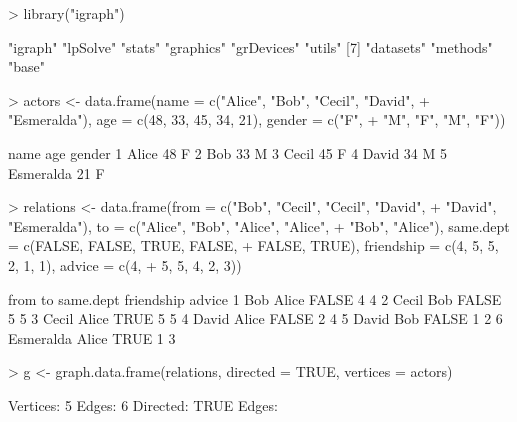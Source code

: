 \documentclass[a4paper,11pt]{scrartcl}
\begin{document}
\begin{Schunk}
\begin{Sinput}
> library("igraph")
\end{Sinput}
\begin{Soutput}
[1] "igraph"    "lpSolve"   "stats"     "graphics"  "grDevices" "utils"    
[7] "datasets"  "methods"   "base"     
\end{Soutput}
\begin{Sinput}
> actors <- data.frame(name = c("Alice", "Bob", "Cecil", "David", 
+     "Esmeralda"), age = c(48, 33, 45, 34, 21), gender = c("F", 
+     "M", "F", "M", "F"))
\end{Sinput}
\begin{Soutput}
       name age gender
1     Alice  48      F
2       Bob  33      M
3     Cecil  45      F
4     David  34      M
5 Esmeralda  21      F
\end{Soutput}
\begin{Sinput}
> relations <- data.frame(from = c("Bob", "Cecil", "Cecil", "David", 
+     "David", "Esmeralda"), to = c("Alice", "Bob", "Alice", "Alice", 
+     "Bob", "Alice"), same.dept = c(FALSE, FALSE, TRUE, FALSE, 
+     FALSE, TRUE), friendship = c(4, 5, 5, 2, 1, 1), advice = c(4, 
+     5, 5, 4, 2, 3))
\end{Sinput}
\begin{Soutput}
       from    to same.dept friendship advice
1       Bob Alice     FALSE          4      4
2     Cecil   Bob     FALSE          5      5
3     Cecil Alice      TRUE          5      5
4     David Alice     FALSE          2      4
5     David   Bob     FALSE          1      2
6 Esmeralda Alice      TRUE          1      3
\end{Soutput}
\begin{Sinput}
> g <- graph.data.frame(relations, directed = TRUE, vertices = actors)
\end{Sinput}
\begin{Soutput}
Vertices: 5 
Edges: 6 
Directed: TRUE 
Edges:
                              

\end{Soutput}
\end{Schunk}
\end{document}
